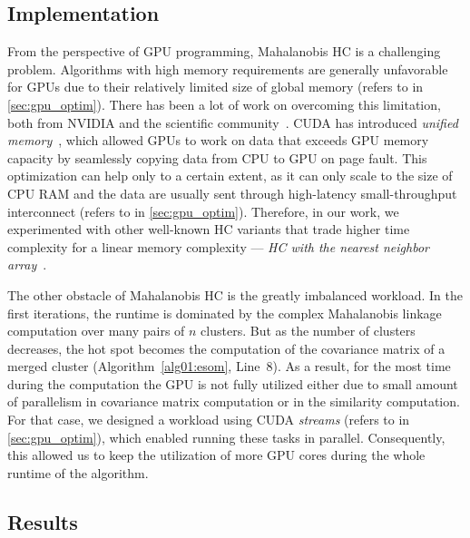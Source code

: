 
\subsection{Implementation}



From the perspective of GPU programming, Mahalanobis HC is a challenging problem. Algorithms with high memory requirements are generally unfavorable for GPUs due to their relatively limited size of global memory (refers to  in \cref{sec:gpu_optim}). There has been a lot of work on overcoming this limitation, both from NVIDIA and the scientific community~\cite{zheng2016towards,kim2020batch,landaverde2014investigation}. CUDA has introduced \emph{unified memory}~\cite{site:cuda}, which allowed GPUs to work on data that exceeds GPU memory capacity by seamlessly copying data from CPU to GPU on page fault. This optimization can help only to a certain extent, as it can only scale to the size of CPU RAM and the data are usually sent through high-latency small-throughput interconnect (refers to  in \cref{sec:gpu_optim}). Therefore, in our work, we experimented with other well-known HC variants that trade higher time complexity for a linear memory complexity --- \emph{HC with the nearest neighbor array}~\cite{day1984efficient}.


The other obstacle of Mahalanobis HC is the greatly imbalanced workload. In the first iterations, the runtime is dominated by the complex Mahalanobis linkage computation over many pairs of $n$ clusters. But as the number of clusters decreases, the hot spot becomes the computation of the covariance matrix of a merged cluster (Algorithm~\ref{alg01:esom}, Line~8). As a result, for the most time during the computation the GPU is not fully utilized either due to small amount of parallelism in covariance matrix computation or in the similarity computation. For that case, we designed a workload using CUDA \emph{streams} (refers to  in \cref{sec:gpu_optim}), which enabled running these tasks in parallel. Consequently, this allowed us to keep the utilization of more GPU cores during the whole runtime of the algorithm.

\subsection{Results}

